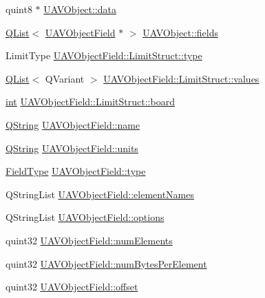 \begin{DoxyCompactItemize}
\item 
quint8 $\ast$ \hyperlink{group___u_a_v_objects_plugin_gadb2f4800bd3b6fb89c0f7c9fb67e49ff}{U\-A\-V\-Object\-::data}
\item 
\hyperlink{class_q_list}{Q\-List}$<$ \hyperlink{class_u_a_v_object_field}{U\-A\-V\-Object\-Field} $\ast$ $>$ \hyperlink{group___u_a_v_objects_plugin_gaafc65699167bc5cedfd058400e484df6}{U\-A\-V\-Object\-::fields}
\item 
Limit\-Type \hyperlink{group___u_a_v_objects_plugin_ga7f346cc2754bc63a0a0ae587b183b3ff}{U\-A\-V\-Object\-Field\-::\-Limit\-Struct\-::type}
\item 
\hyperlink{class_q_list}{Q\-List}$<$ Q\-Variant $>$ \hyperlink{group___u_a_v_objects_plugin_ga27188ffa94eb6c560765dd56b0471561}{U\-A\-V\-Object\-Field\-::\-Limit\-Struct\-::values}
\item 
\hyperlink{ioapi_8h_a787fa3cf048117ba7123753c1e74fcd6}{int} \hyperlink{group___u_a_v_objects_plugin_gae5d5e0653c652c0e50c62526f8fbee72}{U\-A\-V\-Object\-Field\-::\-Limit\-Struct\-::board}
\item 
\hyperlink{group___u_a_v_objects_plugin_gab9d252f49c333c94a72f97ce3105a32d}{Q\-String} \hyperlink{group___u_a_v_objects_plugin_ga9909de3b60e1a954d7356cfc61357b30}{U\-A\-V\-Object\-Field\-::name}
\item 
\hyperlink{group___u_a_v_objects_plugin_gab9d252f49c333c94a72f97ce3105a32d}{Q\-String} \hyperlink{group___u_a_v_objects_plugin_ga1ecf5fdaab2ac408b67623d5d75368c5}{U\-A\-V\-Object\-Field\-::units}
\item 
\hyperlink{uavobjectparser_8h_aa01498a3ceb2fa74dc9536c16caef1da}{Field\-Type} \hyperlink{group___u_a_v_objects_plugin_gad84e6c3a333d2c62b5159936e42fb737}{U\-A\-V\-Object\-Field\-::type}
\item 
Q\-String\-List \hyperlink{group___u_a_v_objects_plugin_ga5849334da3325c4cac8625bb5910d57d}{U\-A\-V\-Object\-Field\-::element\-Names}
\item 
Q\-String\-List \hyperlink{group___u_a_v_objects_plugin_ga97fe1c3ed2d74eb06ea7e24abf4ce09c}{U\-A\-V\-Object\-Field\-::options}
\item 
quint32 \hyperlink{group___u_a_v_objects_plugin_gaa82f6e1f5deca501c58b45d902be0ef4}{U\-A\-V\-Object\-Field\-::num\-Elements}
\item 
quint32 \hyperlink{group___u_a_v_objects_plugin_gaed675e1711f18b1ab737f9e8e55dca35}{U\-A\-V\-Object\-Field\-::num\-Bytes\-Per\-Element}
\item 
quint32 \hyperlink{group___u_a_v_objects_plugin_ga8d473734be71fe3a3dbcd1a854b497f2}{U\-A\-V\-Object\-Field\-::offset}

\end{DoxyCompactItemize}

